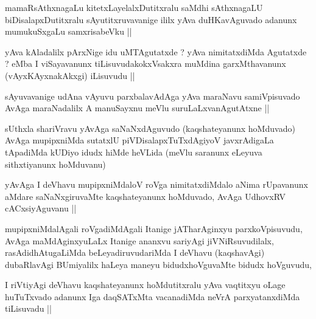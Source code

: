 \begin{artha}
mamaRsAthxnagaLu kitetxLayelalxDutitxralu saMdhi sAthxnagaLU
biDisalapxDutitxralu sAyutitxruvavanige ililx yAva duHKavAguvado
adanunx mumukuSxgaLu samxrisabeVku ||
\end{artha}

\begin{artha}
yAva kAladalilx pArxNige idu uMTAgutatxde ? yAva nimitatxdiMda
Agutatxde ? eMba I viSayavanunx tiLisuvudakokxVsakxra muMdina
garxMthavanunx (vAyxKAyxnakAkxgi) iLisuvudu ||
\end{artha}


\stext


\begin{artha}
sAyuvavanige udAna vAyuvu parxbalavAdAga yAva maraNavu samiVpisuvado
AvAga maraNadalilx A manuSayxnu meVlu suruLaLxvanAgutAtxne ||
\end{artha}


\begin{artha}
sUthxla shariVravu yAvAga saNaNxdAguvudo (kaqshateyanunx hoMduvado)
AvAga mupipxniMda sutatxlU piVDisalapxTuTxdAgiyoV javxrAdigaLa
tApadiMda kUDiyo idudx hiMde heVLida (meVlu saranunx eLeyuva
sithxtiyanunx hoMduvanu)
\end{artha}

\begin{artha}
yAvAga I deVhavu mupipxniMdaloV roVga nimitatxdiMdalo aNima rUpavanunx
aMdare saNaNxgiruvaMte kaqshateyanunx hoMduvado, AvAga UdhovxRV
cACxsiyAguvanu ||
\end{artha}


\begin{artha}
mupipxniMdalAgali roVgadiMdAgali Itanige jATharAginxyu
parxkoVpisuvudu, AvAga maMdAginxyuLaLx Itanige ananxvu sariyAgi
jiVNiRsuvudilalx, rasAdidhAtugaLiMda beLeyadiruvudariMda I deVhavu
(kaqshavAgi) dubaRlavAgi BUmiyalilx haLeya maneyu bidudxhoVguvaMte
bidudx hoVguvudu,
\end{artha}


\begin{artha}
I riVtiyAgi deVhavu kaqshateyanunx hoMdutitxralu yAva vaqtitxyu oLage
huTuTxvado adanunx Iga daqSATxMta vacanadiMda neVrA parxyatanxdiMda
tiLisuvadu ||
\end{artha}

